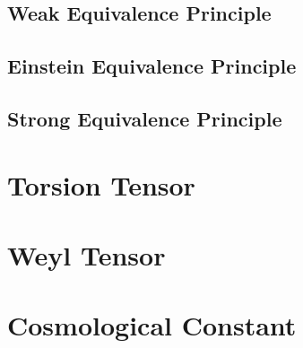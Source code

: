 \subsection{Weak Equivalence Principle}
\label{subsec:wep}

\subsection{Einstein Equivalence Principle}
\label{subsec:eep}

\subsection{Strong Equivalence Principle}
\label{subsec:sep}

\section{Torsion Tensor}
\label{sec:torsion-tensor}

\section{Weyl Tensor}
\label{sec:weyl-tensor}

\section{Cosmological Constant}
\label{sec:cosmos-constant}




